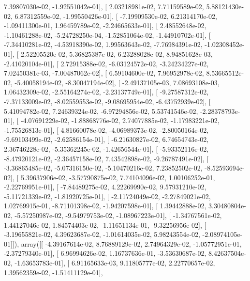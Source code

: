 \documentclass{article}
\begin{document}
          7.39807030e-02,  -1.92551042e-01],
       [  2.03218981e-02,   7.71159589e-02,   5.88121430e-02,
          6.87312559e-02,  -1.99550426e-01],
       [ -7.19909530e-02,   6.21314170e-02,  -1.09411300e-01,
          1.96459789e-02,  -2.24665633e-01],
       [  2.48552648e-02,  -1.10461288e-02,  -5.24728250e-04,
         -1.52851064e-02,  -1.44910702e-01],
       [ -7.34410281e-02,  -4.53918390e-02,   1.99563643e-02,
         -7.76984391e-02,  -1.02308452e-01],
       [  2.52205520e-02,   5.36825387e-02,   6.23288028e-02,
          8.94851628e-03,  -2.41020104e-01],
       [  2.72915388e-02,  -6.03124572e-02,  -3.24234227e-02,
          7.02450381e-03,  -7.00487062e-02],
       [  6.59104600e-02,   7.96952978e-02,   8.53665512e-02,
         -5.40058194e-02,  -8.30047194e-02],
       [ -2.49137105e-03,   7.08693108e-03,   1.06432309e-02,
         -2.55164274e-02,  -2.23137749e-01],
       [ -9.27587312e-02,  -7.37133009e-02,  -8.02559553e-02,
         -9.08695954e-02,  -6.43752939e-02],
       [  5.41094782e-02,   7.24639324e-02,  -6.97294856e-02,
          5.53741546e-02,  -2.28378793e-01],
       [ -4.07691229e-02,  -1.88868776e-02,   2.74077885e-02,
         -1.17983221e-02,  -1.75526813e-01],
       [  4.81660078e-02,  -4.06989373e-02,  -2.80050164e-02,
         -9.69103499e-02,  -2.62586154e-01],
       [ -6.21630827e-02,   6.74654743e-02,   2.36746228e-02,
         -5.35362245e-02,  -1.42656544e-01],
       [ -5.93352116e-02,  -8.47920121e-02,  -2.36457158e-02,
          7.43542898e-02,  -9.26787491e-02],
       [ -3.36865485e-02,  -5.07316150e-02,  -5.10470216e-02,
          7.23852502e-02,  -8.52593694e-02],
       [  5.39637906e-02,  -3.57790875e-02,   7.74104096e-02,
          1.00106252e-01,  -2.22769951e-01],
       [ -7.84489275e-02,   4.22269990e-02,   9.57931210e-02,
         -5.11721339e-02,  -1.81920725e-01],
       [ -2.11724049e-02,  -2.27849021e-02,   1.02769915e-01,
         -8.71101398e-02,  -1.94207598e-01],
       [  1.39442888e-02,   3.30480804e-02,  -5.57250987e-02,
         -9.54979753e-02,  -1.08967223e-01],
       [ -1.34767561e-02,   1.44127046e-02,   1.84574403e-02,
         -1.11651134e-01,  -9.32256956e-02],
       [ -3.19655821e-02,   4.39623687e-02,  -1.01614035e-02,
          5.98243554e-02,  -2.08974105e-01]]), array([[ -4.39167614e-02,   8.76889129e-02,   2.74964329e-02,
         -1.05772951e-01,  -2.37279340e-01],
       [  6.96994626e-02,   1.16737636e-01,  -3.53630687e-02,
          8.42637504e-02,  -1.63653783e-01],
       [  6.91165633e-03,   9.11805777e-02,   2.22770657e-02,
          1.39562359e-02,  -1.51411129e-01],
\end{document}
